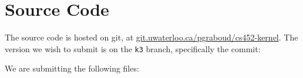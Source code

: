 \documentclass[titlepage]{article}
\begin{document}
\section{Source Code}
The source code is hosted on git, at \url{git.uwaterloo.ca/pgraboud/cs452-kernel}.
The version we wish to submit is on the \texttt{k3} branch, specifically
the commit:

We are submitting the following files:


\end{document}
